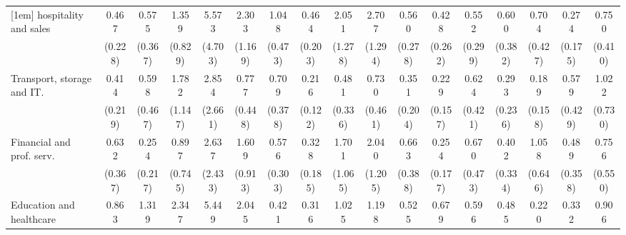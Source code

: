 {\begin{tabular}{l*{16}{c}}
[1em]
hospitality and sales&       0.467         &       0.575         &       1.359         &       5.573\sym{*}  &       2.303         &       1.048         &       0.464         &       2.051         &       2.707\sym{*}  &       0.560         &       0.428         &       0.552         &       0.600         &       0.704         &       0.274\sym{*}  &       0.750         \\
                    &     (0.228)         &     (0.367)         &     (0.829)         &     (4.703)         &     (1.169)         &     (0.473)         &     (0.203)         &     (1.278)         &     (1.294)         &     (0.278)         &     (0.262)         &     (0.299)         &     (0.382)         &     (0.427)         &     (0.175)         &     (0.410)         \\
[1em]
Transport, storage and IT.&       0.414         &       0.598         &       1.782         &       2.854         &       0.777         &       0.709         &       0.216\sym{**} &       0.481         &       0.730         &       0.351         &       0.229\sym{*}  &       0.624         &       0.293         &       0.189\sym{*}  &       0.579         &       1.022         \\
                    &     (0.219)         &     (0.467)         &     (1.147)         &     (2.661)         &     (0.448)         &     (0.378)         &     (0.122)         &     (0.336)         &     (0.461)         &     (0.204)         &     (0.157)         &     (0.421)         &     (0.236)         &     (0.158)         &     (0.429)         &     (0.730)         \\
[1em]
Financial and prof. serv.&       0.632         &       0.254         &       0.897         &       2.637         &       1.609         &       0.576         &       0.328\sym{*}  &       1.701         &       2.040         &       0.663         &       0.254\sym{*}  &       0.670         &       0.402         &       1.058         &       0.489         &       0.756         \\
                    &     (0.367)         &     (0.217)         &     (0.745)         &     (2.433)         &     (0.913)         &     (0.303)         &     (0.185)         &     (1.065)         &     (1.205)         &     (0.388)         &     (0.177)         &     (0.473)         &     (0.334)         &     (0.646)         &     (0.358)         &     (0.550)         \\
[1em]
Education and healthcare&       0.863         &       1.319         &       2.347         &       5.449         &       2.045         &       0.421         &       0.316\sym{*}  &       1.025         &       1.198         &       0.525         &       0.679         &       0.596         &       0.485         &       0.220\sym{*}  &       0.332         &       0.906         \\

\end{tabular}}
